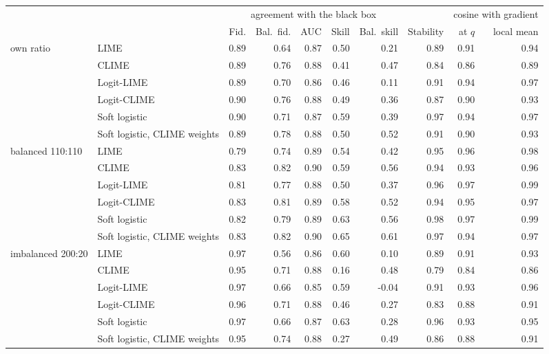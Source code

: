 \begin{tabular}{@{}llrrrrrrrr@{}}
  \toprule
   &  & \multicolumn{5}{c}{agreement with the black box} &  & \multicolumn{2}{c}{cosine with gradient} \\
  \cmidrule(lr){3-7} \cmidrule(lr){9-10}
   &  & Fid. & Bal.\ fid. & AUC & Skill & Bal.\ skill & Stability & at $q$ & local mean \\
  \midrule
  own ratio & LIME & 0.89 & 0.64 & 0.87 & 0.50 & 0.21 & 0.89 & 0.91 & 0.94 \\
   & CLIME & 0.89 & 0.76 & 0.88 & 0.41 & 0.47 & 0.84 & 0.86 & 0.89 \\
   & Logit-LIME & 0.89 & 0.70 & 0.86 & 0.46 & 0.11 & 0.91 & 0.94 & 0.97 \\
   & Logit-CLIME & 0.90 & 0.76 & 0.88 & 0.49 & 0.36 & 0.87 & 0.90 & 0.93 \\
   & Soft logistic & 0.90 & 0.71 & 0.87 & 0.59 & 0.39 & 0.97 & 0.94 & 0.97 \\
   & Soft logistic, CLIME weights & 0.89 & 0.78 & 0.88 & 0.50 & 0.52 & 0.91 & 0.90 & 0.93 \\
  \midrule
  balanced 110:110 & LIME & 0.79 & 0.74 & 0.89 & 0.54 & 0.42 & 0.95 & 0.96 & 0.98 \\
   & CLIME & 0.83 & 0.82 & 0.90 & 0.59 & 0.56 & 0.94 & 0.93 & 0.96 \\
   & Logit-LIME & 0.81 & 0.77 & 0.88 & 0.50 & 0.37 & 0.96 & 0.97 & 0.99 \\
   & Logit-CLIME & 0.83 & 0.81 & 0.89 & 0.58 & 0.52 & 0.94 & 0.95 & 0.97 \\
   & Soft logistic & 0.82 & 0.79 & 0.89 & 0.63 & 0.56 & 0.98 & 0.97 & 0.99 \\
   & Soft logistic, CLIME weights & 0.83 & 0.82 & 0.90 & 0.65 & 0.61 & 0.97 & 0.94 & 0.97 \\
  \midrule
  imbalanced 200:20 & LIME & 0.97 & 0.56 & 0.86 & 0.60 & 0.10 & 0.89 & 0.91 & 0.93 \\
   & CLIME & 0.95 & 0.71 & 0.88 & 0.16 & 0.48 & 0.79 & 0.84 & 0.86 \\
   & Logit-LIME & 0.97 & 0.66 & 0.85 & 0.59 & -0.04 & 0.91 & 0.93 & 0.96 \\
   & Logit-CLIME & 0.96 & 0.71 & 0.88 & 0.46 & 0.27 & 0.83 & 0.88 & 0.91 \\
   & Soft logistic & 0.97 & 0.66 & 0.87 & 0.63 & 0.28 & 0.96 & 0.93 & 0.95 \\
   & Soft logistic, CLIME weights & 0.95 & 0.74 & 0.88 & 0.27 & 0.49 & 0.86 & 0.88 & 0.91 \\
  \bottomrule
\end{tabular}

